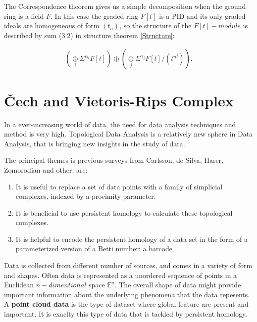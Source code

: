 \documentclass[11pt,a4paper]{report}
\begin{document}
            The Correspondence theorem gives us a simple decomposition when the ground ring is a field $F$. In this case the graded ring $F[t]$ is a PID and its only graded ideals are homogeneous of form $(t_n)$, so the structure of the $F[t]-module$ is described by sum (3.2) in structure theorem \ref{Structure}:

            \begin{align}
                (\underset{i}{\oplus} \Sigma^{\alpha_i} F[t]) \oplus (\underset{j}{\oplus} \Sigma ^{\gamma_j} F[t]/(t^{n^j})).
              \end{align}
              
              
              
              \section{\v{C}ech and Vietoris-Rips Complex}
              \label{CechRips}
              
              In a ever-increasing world of data, the need for data analysis techniques and method is very high. 
              Topological Data Analysis is a relatively new sphere in Data Analysis, that is bringing new insights in the study of data. 
              
              The principal themes is previous surveys from Carlsson, de Silva, Harer, Zomorodian and other, are:
              \begin{enumerate}
               \item It is useful to replace a set of data points with a family of simplicial complexes, indexed by a 
               procimity parameter. 
               \item It is beneficial to use persistent homology to calculate these topological complexes.
               \item It is helpful to encode the persistent homology of a data set in the form
of a parameterized version of a Betti number: a barcode
              \end{enumerate}
              
              Data is collected from different number of sources, and comes in a variety of form and shapes. Often data is represented as a unordered sequence of points in a Euclidean $n-dimentional$ space $\mathbb{E}^n$. The overall shape of data might provide important information about the underlying phenomena that
              the data repesents. A \textbf{point cloud data} is the type of dataset where global feature are present and important. It is exaclty this type of data that is tackled by persistent homology. \cite{Ghrist_2007}
              
\end{document}
